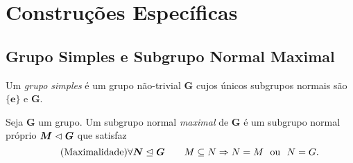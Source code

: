 







































\cleardoublepage
\section{Construções Específicas}

\subsection{Grupo Simples e Subgrupo Normal Maximal}

\begin{defi}
Um \emph{grupo simples} é um grupo não-trivial $\bm G$ cujos únicos subgrupos normais são $\bm{\{e\}}$ e $\bm G$.
\end{defi}

\begin{defi}
Seja $\bm G$ um grupo. Um subgrupo normal \emph{maximal} de $\bm G$ é um subgrupo normal próprio $\bm M \mathrel{\lhd} \bm G$ que satisfaz
	\begin{equation*}
	\tag{Maximalidade} \forall \bm N \mathrel{\unlhd} \bm G \qquad M \subseteq N \Rightarrow N = M \text{\ \ ou\ \ } N = G.
	\end{equation*}
\end{defi}

